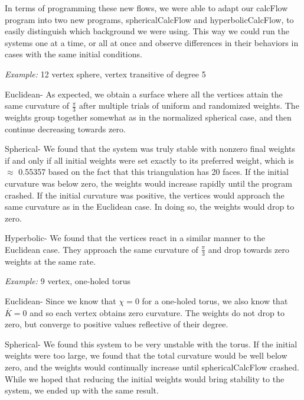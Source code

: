 \documentclass[12pt]{article}
\begin{document}
\noindent In terms of programming these new flows, we were able to adapt our calcFlow program into two new programs, sphericalCalcFlow and hyperbolicCalcFlow, to easily distinguish which background we were using. This way we could run the systems one at a time, or all at once and observe differences in their behaviors in cases with the same initial conditions. \newline

\noindent \textit{Example:} 12 vertex sphere, vertex transitive of degree 5\newline

\noindent Euclidean- As expected, we obtain a surface where all the vertices attain the same curvature of $\frac{\pi}{3}$ after multiple trials of uniform and randomized weights. The weights group together somewhat as in the normalized spherical case, and then continue decreasing towards zero.\newline

\noindent Spherical- We found that the system was truly stable with nonzero final weights if and only if all initial weights were set exactly to its preferred weight, which is $\approx$ 0.55357 based on the fact that this triangulation has 20 faces. If the initial curvature was below zero, the weights would increase rapidly until the program crashed. If the initial curvature was positive, the vertices would approach the same curvature as in the Euclidean case. In doing so, the weights would drop to zero.\newline

\noindent Hyperbolic- We found that the vertices react in a similar manner to the Euclidean case. They approach the same curvature of $\frac{\pi}{3}$ and drop towards zero weights at the same rate.\newline 

\noindent \textit{Example:} 9 vertex, one-holed torus\newline

\noindent Euclidean- Since we know that $\chi = 0$ for a one-holed torus, we also know that $\overline{K} = 0$ and so each vertex obtains zero curvature. The weights do not drop to zero, but converge to positive values reflective of their degree. \newline

\noindent Spherical- We found this system to be very unstable with the torus. If the initial weights were too large, we found that the total curvature would be well below zero, and the weights would continually increase until sphericalCalcFlow crashed. While we hoped that reducing the initial weights would bring stability to the system, we ended up with the same result.
\end{document}
